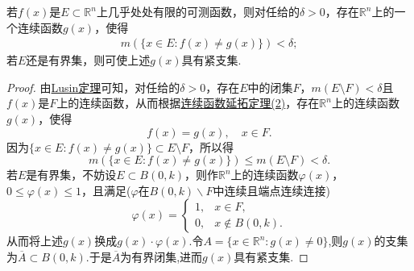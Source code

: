 \documentclass[../../main.tex]{subfiles}%
\begin{document}
\begin{corollary}\label{corollary:推论3.19}
若\(f(x)\)是\(E \subset \mathbb{R}^{n}\)上几乎处处有限的可测函数，则对任给的\(\delta > 0\)，存在\(\mathbb{R}^{n}\)上的一个连续函数\(g(x)\)，使得
\begin{align*}
m(\{x \in E: f(x) \neq g(x)\}) < \delta; 
\end{align*}
若\(E\)还是有界集，则可使上述\(g(x)\)具有紧支集.
\end{corollary}
\begin{proof}
由\hyperref[theorem:Lusin(卢津)定理]{Lusin定理}可知，对任给的\(\delta > 0\)，存在\(E\)中的闭集\(F\)，\(m(E \setminus F) < \delta\)且\(f(x)\)是\(F\)上的连续函数，从而根据\hyperref[theorem:连续函数延拓定理]{连续函数延拓定理(2)}，存在\(\mathbb{R}^{n}\)上的连续函数\(g(x)\)，使得
\[f(x) = g(x), \quad x \in F.\]
因为\(\{x \in E: f(x) \neq g(x)\} \subset E \setminus F\)，所以得
\[m(\{x \in E: f(x) \neq g(x)\}) \leqslant m(E \setminus F) < \delta.\]
若\(E\)是有界集，不妨设\(E \subset B(0, k)\)，则作\(\mathbb{R}^{n}\)上的连续函数\(\varphi(x)\)，\(0 \leqslant \varphi(x) \leqslant 1\)，且满足($\varphi$在$B(0,k)\backslash F$中连续且端点连续连接)
\[\varphi(x) = 
\begin{cases}
1, & x \in F, \\
0, & x \notin B(0, k).
\end{cases}\]
从而将上述\(g(x)\)换成\(g(x) \cdot \varphi(x)\).令$A=\{x\in \mathbb{R}^n:g(x)\ne 0\}$,则$g(x)$的支集为$\overline{A}\subset B(0,k)$.于是$\overline{A}$为有界闭集,进而$g(x)$具有紧支集.
\end{proof}
\end{document}
